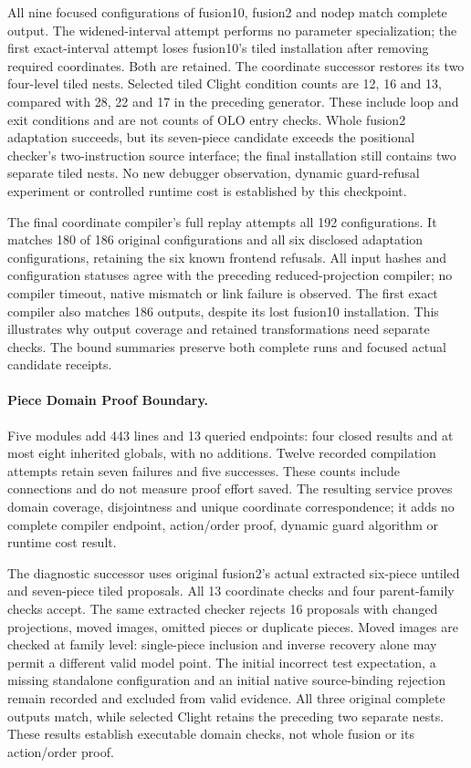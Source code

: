 All nine focused configurations of fusion10, fusion2 and nodep match complete
output. The widened-interval attempt performs no parameter specialization;
the first exact-interval attempt loses fusion10's tiled installation after
removing required coordinates. Both are retained. The coordinate successor
restores its two four-level tiled nests. Selected tiled Clight condition counts
are 12, 16 and 13, compared with 28, 22 and 17 in the preceding generator.
These include loop and exit conditions and are not counts of OLO entry checks.
Whole fusion2 adaptation succeeds, but its seven-piece candidate exceeds the
positional checker's two-instruction source interface; the final installation
still contains two separate tiled nests. No new debugger observation,
dynamic guard-refusal experiment or controlled runtime cost is established
by this checkpoint.


The final coordinate compiler's full replay attempts all 192 configurations.
It matches 180 of 186 original configurations and all six disclosed adaptation
configurations, retaining the six known frontend refusals. All input hashes
and configuration statuses agree with the preceding reduced-projection compiler;
no compiler timeout, native mismatch or link failure is observed. The first
exact compiler also matches 186 outputs, despite its lost fusion10 installation.
This illustrates why output coverage and retained transformations need separate
checks. The bound summaries preserve both complete runs and focused actual
candidate receipts.

\paragraph{Piece Domain Proof Boundary.}
Five modules add 443 lines and 13 queried endpoints: four closed results and at
most eight inherited globals, with no additions. Twelve recorded compilation
attempts retain seven failures and five successes. These counts include
connections and do not measure proof effort saved. The resulting service proves
domain coverage, disjointness and unique coordinate correspondence; it adds no
complete compiler endpoint, action/order proof, dynamic guard algorithm or
runtime cost result.

The diagnostic successor uses original fusion2's actual extracted six-piece
untiled and seven-piece tiled proposals. All 13 coordinate checks and four
parent-family checks accept. The same extracted checker rejects 16 proposals
with changed projections, moved images, omitted pieces or duplicate pieces.
Moved images are checked at family level: single-piece inclusion and inverse
recovery alone may permit a different valid model point. The initial incorrect
test expectation, a missing standalone configuration and an initial native
source-binding rejection remain recorded and excluded from valid evidence.
All three original complete outputs match, while selected Clight retains the
preceding two separate nests. These results establish executable domain checks,
not whole fusion or its action/order proof.

